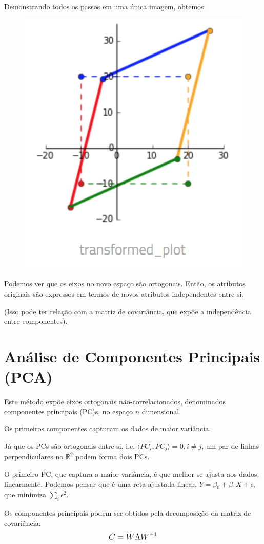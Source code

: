 \documentclass{article}
\begin{document}
Demonstrando todos os passos em uma única imagem, obtemos:

\begin{figure}[!ht]
\begin{center}
  \includegraphics[width=0.4\linewidth]{images/transformed_plot.png}
\end{center}
\end{figure}

Podemos ver que os eixos no novo espaço são ortogonais. Então, os atributos originais são expressos em termos de novos atributos independentes entre si.

(Isso pode ter relação com a matriz de covariância, que expôe a independência entre componentes).


\pagebreak

\section{Análise de Componentes Principais (PCA)}

\hfill

Este método expõe eixos ortogonais não-correlacionados, denominados componentes principais (PC)s, no espaço $n$ dimensional.

Os primeiros componentes capturam os dados de maior variância.

Já que os PCs são ortogonais entre si, i.e. $\langle PC_i, PC_j \rangle = 0, i \neq j$, um par de linhas perpendiculares no $\mathbb{R}^2$ podem forma dois PCs.

O primeiro PC, que captura a maior variância, é que melhor se ajusta aos dados, linearmente. Podemos pensar que é uma reta ajustada linear, $Y = \beta_0 + \beta_1X + \epsilon$, que minimiza $\sum_i \epsilon^2$.

Os componentes principais podem ser obtidos pela decomposição da matriz de covariância:
\begin{equation}
\mathlarger{
C = W \Lambda W^{-1}
}
\end{equation}
\end{document}
